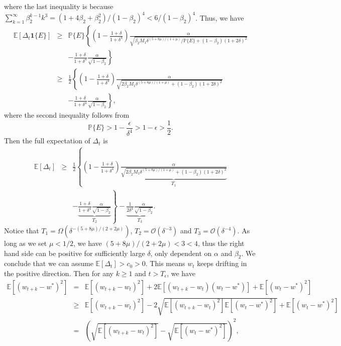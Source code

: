 \documentclass[twoside]{article}
\def\EE{\mathbb{E}}
\def\PP{\mathbb{P}}
\def\OO{\mathcal{O}}
\begin{document}
where the last inequality is because $\sum_{k=1}^\infty \beta_2^{k-1}k^3 = (1+4\beta_2+\beta_2^2)/(1-\beta_2)^4<6/(1-\beta_2)^4$. Thus, we have
\begin{eqnarray}
\EE\left[\Delta_t\mathbf{1}\{E\}\right]&\geq& \PP\{E\}\left\{ \left(1-\frac{1+\delta}{1+\delta^4}\right)\frac{\alpha}{\sqrt{\beta_2M_1 \delta ^{(5+8\mu)/(1+\mu)}/\PP\{E\}+ (1-\beta_2)(1+2\delta)^2}}\right.\nonumber\\
&&\left.- \frac{1+\delta}{1+\delta^4}\frac{\alpha}{\sqrt{1-\beta_2}}\right\}\nonumber\\
&\geq& \frac{1}{2}\left\{ \left(1-\frac{1+\delta}{1+\delta^4}\right)\frac{\alpha}{\sqrt{2\beta_2M_1 \delta ^{(5+8\mu)/(1+\mu)}+ (1-\beta_2)(1+2\delta)^2}}\right.\nonumber\\
&&\left.- \frac{1+\delta}{1+\delta^4}\frac{\alpha}{\sqrt{1-\beta_2}}\right\},\nonumber
\end{eqnarray}
where the second inequality follows from
$$\PP\{E\} >1-\frac{\epsilon}{\delta^4} >1 - \epsilon > \frac{1}{2}.$$
Then the full expectation of $\Delta_t$ is
\begin{eqnarray}
\EE\left[\Delta_t\right]&\geq& \frac{1}{2}\left\{ \left(1-\frac{1+\delta}{1+\delta^4}\right)\underbrace{\frac{\alpha}{\sqrt{2\beta_2 M_1 \delta ^{(5+8\mu)/(1+\mu)}+ (1-\beta_2)(1+2\delta)^2}}}_{T_1}\right.\nonumber\\
&&\left.- \underbrace{\frac{1+\delta}{1+\delta^4}\frac{\alpha}{\sqrt{1-\beta_2}}}_{T_2}\right\} - \underbrace{\frac{1}{2\delta^4} \frac{\alpha}{\sqrt{1-\beta_2}}}_{T_3}.\nonumber
\end{eqnarray}
Notice that $T_1 =\Omega(\delta^{-(5+8\mu)/(2+2\mu)})$, $T_2=\OO(\delta^{-3})$ and $T_3=\OO(\delta^{-4})$. As long as we set $\mu<1/2$, we have $(5+8\mu)/(2+2\mu) < 3 < 4$, thus the right hand side can be positive for sufficiently large $\delta$, only dependent on $\alpha$ and $\beta_2$. We conclude that we can assume $\EE[\Delta_t]>c_0>0$. This means $w_t$ keeps drifting in the positive direction. Then for any $k\geq 1$ and $t>T_\epsilon$, we have
\begin{eqnarray}
\EE\left[(w_{t+k}-w^*)^2\right] &=& \EE\left[(w_{t+k}-w_t)^2\right] + 2\EE\left[(w_{t+k}-w_t)(w_t-w^*)\right] + \EE\left[(w_t-w^*)^2\right]\nonumber \\
&\geq& \EE\left[(w_{t+k}-w_t)^2\right] - 2 \sqrt{\EE\left[(w_{t+k}-w_t)^2  \right]\EE\left[(w_t-w^*)^2\right]} + \EE\left[ (w_t-w^*)^2\right]\nonumber\\
&=& \left(\sqrt{\EE\left[(w_{t+k}-w_t)^2\right]} - \sqrt{\EE\left[(w_t-w^*)^2\right]}\right)^2 ,\label{Thm1Last}
\end{eqnarray}
\end{document}
